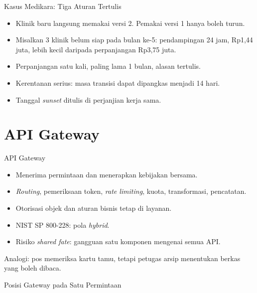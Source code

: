 \documentclass[aspectratio=169, table, 12pt]{beamer}
\begin{document}
\begin{frame}{{\Large Kasus Medikara: Tiga Aturan Tertulis}}
  \vspace{8pt}
  \begin{itemize}
    \item Klinik baru langsung memakai versi 2. Pemakai versi 1 hanya boleh turun.
    \item Misalkan 3 klinik belum siap pada bulan ke-5: pendampingan 24 jam, Rp1,44 juta, lebih kecil daripada perpanjangan Rp3,75 juta.
    \item Perpanjangan satu kali, paling lama 1 bulan, alasan tertulis.
    \item Kerentanan serius: masa transisi dapat dipangkas menjadi 14 hari.
    \item Tanggal \textit{sunset} ditulis di perjanjian kerja sama.
  \end{itemize}
\end{frame}

\section{API Gateway}

\begin{frame}{{\Large API Gateway}}
  \vspace{8pt}
  \begin{itemize}
    \item Menerima permintaan dan menerapkan kebijakan bersama.
    \item \textit{Routing}, pemeriksaan token, \textit{rate limiting}, kuota, transformasi, pencatatan.
    \item Otorisasi objek dan aturan bisnis tetap di layanan.
    \item NIST SP 800-228: pola \textit{hybrid}.
    \item Risiko \textit{shared fate}: gangguan satu komponen mengenai semua API.
  \end{itemize}
  \vspace{6pt}
  {\small Analogi: pos memeriksa kartu tamu, tetapi petugas arsip menentukan berkas yang boleh dibaca.}
\end{frame}

\begin{frame}{{\Large Posisi Gateway pada Satu Permintaan}}
  \centering
\end{frame}
\end{document}
